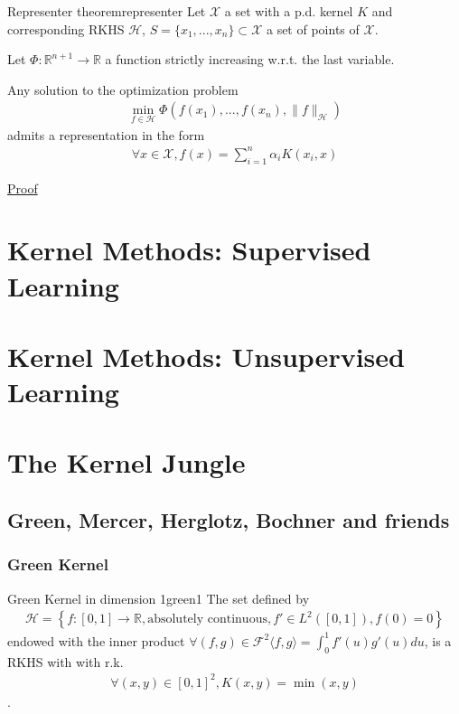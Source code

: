 \documentclass{article}
\begin{document}
\begin{Theorem}{Representer theorem}{representer}
  Let $\mathcal{X}$ a set with a p.d. kernel $K$ and corresponding RKHS 
  $\mathcal{H}$, $S = \{x_1, ..., x_n\} \subset \mathcal{X}$ a set of points of 
  $\mathcal{X}$.

  Let $\Phi : \mathbb{R}^{n+1} \rightarrow \mathbb{R}$ a function strictly 
  increasing w.r.t. the last variable.

  Any solution to the optimization problem
  \begin{align*}
    \min_{f\in \mathcal{H}} \Phi(f(x_1), ..., f(x_n), \lVert f
    \rVert_\mathcal{H})
  \end{align*}
  admits a representation in the form 
  \begin{align*}
    \forall x \in \mathcal{X}, f(x) = \sum_{i=1}^n \alpha_i K(x_i, x)
  \end{align*}

  \par\hfill \hyperref[prf:representer]{\small Proof}
\end{Theorem}

\section{Kernel Methods: Supervised Learning}

\section{Kernel Methods: Unsupervised Learning}

\section{The Kernel Jungle}
\subsection{Green, Mercer, Herglotz, Bochner and friends}

\subsubsection{Green Kernel}

\begin{Theorem}{Green Kernel in dimension 1}{green1}
  The set defined by
  \begin{align*}
    \mathcal{H} = \left\{f: [0, 1] \rightarrow \mathbb{R}, \text{absolutely 
    continuous}, f' \in L^2([0, 1]), f(0) = 0 \right\}
  \end{align*}
  endowed with the inner product $\forall (f, g) \in \mathcal{F}^2 \langle f, g
  \rangle = \int_0^1 f'(u)g'(u)du$, 
  is a RKHS with with r.k.
  \begin{align*}
    \forall (x, y) \in [0, 1]^2, K(x, y) = \min(x, y)
  \end{align*}.
\end{Theorem}
\end{document}
